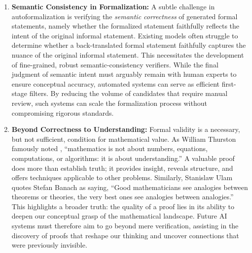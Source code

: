 \documentclass[11pt]{article}
\numberwithin{equation}{section}
\begin{document}
\begin{enumerate}
    \item \textbf{Semantic Consistency in Formalization:} A subtle challenge in autoformalization is verifying the \emph{semantic correctness} of generated formal statements, namely whether the formalized statement faithfully reflects the intent of the original informal statement. Existing models often struggle to determine whether a back-translated formal statement faithfully captures the nuance of the original informal statement. This necessitates the development of fine-grained, robust semantic-consistency verifiers. While the final judgment of semantic intent must arguably remain with human experts to ensure conceptual accuracy, automated systems can serve as efficient first-stage filters. By reducing the volume of candidates that require manual review, such systems can scale the formalization process without compromising rigorous standards.

    \item \textbf{Beyond Correctness to Understanding:} Formal validity is a necessary, but not sufficient, condition for mathematical value. As William Thurston famously noted \cite{c7da7d34-de5b-3a8d-8096-59d6b94e9a82}, ``mathematics is not about numbers, equations, computations, or algorithms: it is about understanding.'' A valuable proof does more than establish truth; it provides insight, reveals structure, and offers techniques applicable to other problems. Similarly, Stanislaw Ulam \cite{ulam1976adventures} quotes Stefan Banach as saying, ``Good mathematicians see analogies between theorems or theories, the very best ones see analogies between analogies.'' This highlights a broader truth: the quality of a proof lies in its ability to deepen our conceptual grasp of the mathematical landscape. Future AI systems must therefore aim to go beyond mere verification, assisting in the discovery of proofs that reshape our thinking and uncover connections that were previously invisible. 


\end{enumerate}
\end{document}
